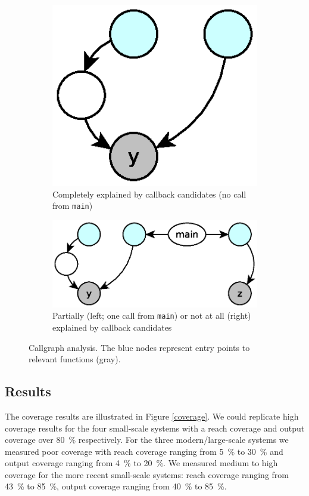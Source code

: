 \documentclass{sig-alternate-05-2015}
\begin{document}
\begin{figure}
	\centering
	\begin{subfigure}[t]{0.18\textwidth}
	\centering
		\includegraphics[scale=0.4]{images-paper/callgraph_a}
		\caption{Completely explained by callback candidates (no call from
		\texttt{main})}
		\label{callgraph_a}
    \end{subfigure}
	\hfill
	\begin{subfigure}[t]{0.25\textwidth}
	\centering
		\includegraphics[scale=0.4]{images-paper/callgraph_b}
		\caption{Partially (left; one call from \texttt{main}) or not at all  (right)
		explained by callback candidates}
		\label{callgraph_b}
    \end{subfigure}
    \caption{Callgraph analysis. The blue nodes represent entry points to
    relevant functions (gray).}
    \label{callgraph}
\end{figure}

\subsection{Results} \label{results}

The coverage results are illustrated in Figure \ref{coverage}. We could replicate high coverage results for the four small-scale systems with a reach coverage and output coverage over 80~\% respectively. For the three modern/large-scale systems we measured poor coverage with reach coverage ranging from 5~\% to 30~\% and output coverage ranging from 4~\% to 20~\%. We measured medium to high coverage for the more recent small-scale systems: reach coverage ranging from 43~\% to 85~\%, output coverage ranging from 40~\% to 85~\%.
\end{document}
